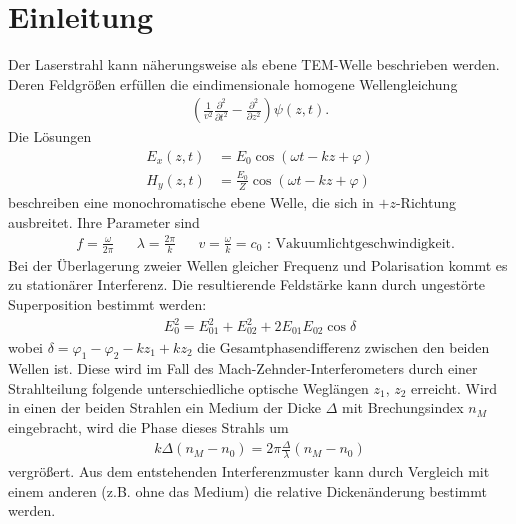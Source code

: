 \section{Einleitung}

Der Laserstrahl kann näherungsweise als ebene TEM-Welle beschrieben werden. Deren Feldgrößen erfüllen die eindimensionale homogene Wellengleichung
	\begin{align*}
	\left(\frac{1}{v^2}\frac{\partial^2}{\partial t^2} - \frac{\partial^2}{\partial z^2}\right)\psi(z,t).
	\end{align*}
Die Lösungen
	\begin{align*}
	E_x(z,t) &=E_{0}\cos(\omega t - kz + \varphi)\\
	H_y(z,t) &=\frac{E_{0}}{Z}\cos(\omega t - kz + \varphi)
	\end{align*}
beschreiben eine monochromatische ebene Welle, die sich in $+z$-Richtung ausbreitet. Ihre Parameter sind
	\begin{align*}
	& f=\frac{\omega}{2\pi} &&\lambda=\frac{2\pi}{k} && v = \frac{\omega}{k} = c_0 \mbox{ : Vakuumlichtgeschwindigkeit.}
	\end{align*}
Bei der Überlagerung zweier Wellen gleicher Frequenz und Polarisation kommt es zu stationärer Interferenz. Die resultierende Feldstärke kann durch ungestörte Superposition bestimmt werden:
	\begin{align*}
	E_0^2 = E_{01}^2+ E_{02}^2 + 2 E_{01} E_{02} \cos\delta
	\end{align*}
wobei $\delta = \varphi_1-\varphi_2 - kz_1 + kz_2$ die Gesamtphasendifferenz zwischen den beiden Wellen ist. Diese wird im Fall des Mach-Zehnder-Interferometers durch einer Strahlteilung folgende unterschiedliche optische Weglängen $z_1$, $z_2$ erreicht. Wird in einen der beiden Strahlen ein Medium der Dicke $\Delta$ mit Brechungsindex $n_M$ eingebracht, wird die Phase dieses Strahls um 
	\begin{align*}
	k\Delta(n_M - n_0) = 2\pi\frac{\Delta}{\lambda}(n_M-n_0)
	\end{align*}
vergrößert. Aus dem entstehenden Interferenzmuster kann durch Vergleich mit einem anderen (z.B. ohne das Medium) die relative Dickenänderung bestimmt werden.